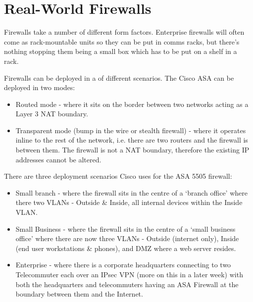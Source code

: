 \section{Real-World Firewalls}
Firewalls take a number of different form factors. Enterprise firewalls will often come as rack-mountable units so they can be put in comms racks, but there's nothing stopping them being a small box which has to be put on a shelf in a rack. 

Firewalls can be deployed in a of different scenarios. The Cisco ASA can be deployed in two modes:
\begin{itemize}
    \item Routed mode - where it sits on the border between two networks acting as a Layer 3 NAT boundary.
    \item Transparent mode (bump in the wire or stealth firewall) - where it operates inline to the rest of the network, i.e. there are two routers and the firewall is between them. The firewall is not a NAT boundary, therefore the existing IP addresses cannot be altered.
\end{itemize}

There are three deployment scenarios Cisco uses for the ASA 5505 firewall:
\begin{itemize}
    \item Small branch - where the firewall sits in the centre of a `branch office' where there two VLANs - Outside \& Inside, all internal devices within the Inside VLAN.
    \item Small Business - where the firewall sits in the centre of a `small business office' where there are now three VLANs - Outside (internet only), Inside (end user workstations \& phones), and DMZ where a web server resides.
    \item Enterprise - where there is a corporate headquarters connecting to two Telecommuter each over an IPsec VPN (more on this in a later week) with both the headquarters and telecommuters having an ASA Firewall at the boundary between them and the Internet.
\end{itemize}